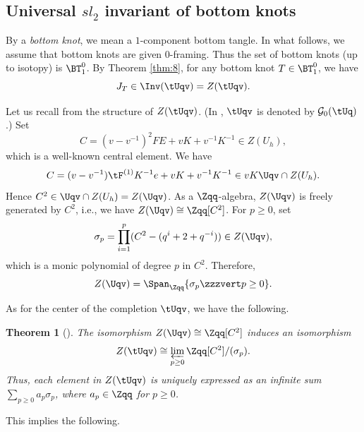 \documentclass{amsart}
\numberwithin{equation}{section}
\numberwithin{figure}{section}
\theoremstyle{plain}
\newtheorem{theorem}{Theorem}[section]
\theoremstyle{definition}
\theoremstyle{remark}
\begin{document}
\subsection{Universal $sl_2$ invariant of bottom knots}
\label{sec:case-n=1}

By a {\em bottom knot}, we mean a $1$-component bottom tangle.  In
what follows, we assume that bottom knots are given $0$-framing.  Thus
the set of bottom knots (up to isotopy) is $\BT^0_1$.  By Theorem
\ref{thm:8}, for any bottom knot $T\in \BT^0_1$, we have
\begin{equation}
  \label{e34}
  J_T\in \Inv(\tUqv)=Z(\tUqv).
\end{equation}

Let us recall from \cite{H:uqsl2} the structure of $Z(\tUqv)$.
(In \cite{H:uqsl2}, $\tUqv$ is denoted by $\mathcal{G}_0(\tUq)$.)
Set
\begin{equation*}
  C = (v-v^{-1})^2 FE+vK+v^{-1}K^{-1}\in Z(U_h),
\end{equation*}
which is a well-known central element.  We have
\begin{equation*}
  C= (v-v^{-1}) \tF^{(1)}K^{-1}e+vK+v^{-1}K^{-1}
  \in vK\Uqv\cap Z(U_h).
\end{equation*}
Hence $C^2\in \Uqv\cap Z(U_h)=Z(\Uqv)$.  As a $\Zqq$-algebra, $Z(\Uqv)$ is
freely generated by $C^2$, i.e., we have $Z(\Uqv)\cong\Zqq[C^2]$.  For
$p\ge 0$, set
\begin{equation*}
  \sigma _p = \prod_{i=1}^p(C^2-(q^i+2+q^{-i}))\in Z(\Uqv),
\end{equation*}
which is a monic polynomial of degree $p$ in $C^2$.  Therefore,
\begin{equation*}
  Z(\Uqv) = \Span_{\Zqq}\{\sigma _p\zzzvert p\ge 0\}.
\end{equation*}

As for the center of the completion $\tUqv$, we have the following.

\begin{theorem}[{\cite[Theorem 11.2]{H:uqsl2}}]
  \label{thm:10}
  The isomorphism $Z(\Uqv)\cong \Zqq[C^2]$ induces an isomorphism
  \begin{equation*}
    Z(\tUqv) \cong \varprojlim_{p\ge 0} \Zqq[C^2]/(\sigma _p).
  \end{equation*}
  Thus, each element in $Z(\tUqv)$ is uniquely expressed as an infinite sum
  $\sum_{p\ge 0} a_p \sigma _p$, where $a_p\in \Zqq$ for $p\ge 0$.
\end{theorem}

This implies the following.
\end{document}

